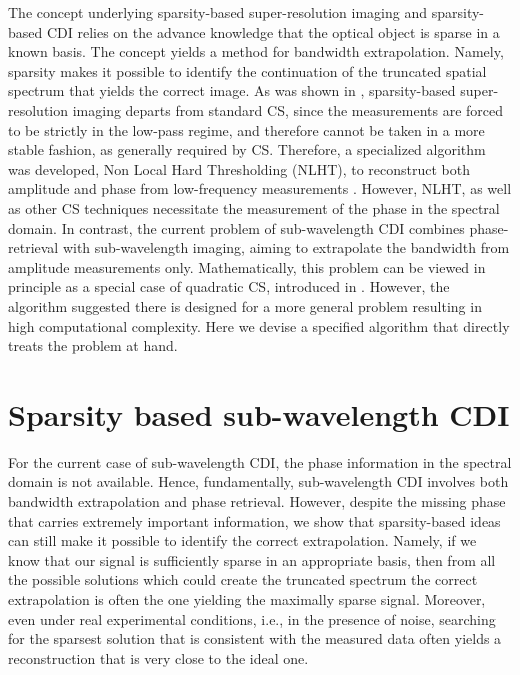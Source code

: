 The concept underlying sparsity-based super-resolution imaging and
sparsity-based CDI relies on the advance knowledge that the optical
object is sparse in a known basis. The concept yields a method for
bandwidth extrapolation. Namely, sparsity makes it possible to
identify the continuation of the truncated spatial spectrum that
yields the correct image. As was shown in
, sparsity-based super-resolution
imaging departs from standard CS, since the measurements are forced to
be strictly in the low-pass regime, and therefore cannot be taken in a
more stable fashion, as generally required by CS. Therefore, a
specialized algorithm was developed, Non Local Hard Thresholding
(NLHT), to reconstruct both amplitude and phase from low-frequency
measurements . However, NLHT, as well as
other CS techniques necessitate the measurement of the phase in the
spectral domain. In contrast, the current problem of sub-wavelength
CDI combines phase-retrieval with sub-wavelength imaging, aiming to
extrapolate the bandwidth from amplitude measurements
only. Mathematically, this problem can be viewed in principle as a
special case of quadratic CS, introduced in
. However, the algorithm suggested there
is designed for a more general problem resulting in high computational
complexity. Here we devise a specified algorithm that directly treats
the problem at hand.




\section{Sparsity based sub-wavelength CDI}
\label{sec:sparsity-based-cdi}
For the current case of
sub-wavelength CDI, the phase information in the spectral domain is
not available. Hence, fundamentally, sub-wavelength CDI involves both
bandwidth extrapolation and phase retrieval. However, despite the
missing phase that carries extremely important information, we show
that sparsity-based ideas can still make it possible to identify the
correct extrapolation. Namely, if we know that our signal is
sufficiently sparse in an appropriate basis, then from all the
possible solutions which could create the truncated spectrum the
correct extrapolation is often the one yielding the maximally sparse
signal. Moreover, even under real experimental conditions, i.e., in
the presence of noise, searching for the sparsest solution that is
consistent with the measured data often yields a reconstruction that
is very close to the ideal one.

